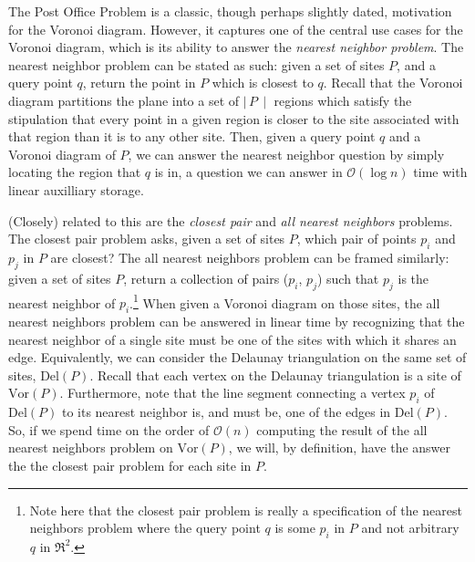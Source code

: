 \documentclass[12pt,twoside]{reedthesis}
\begin{document}
    The Post Office Problem is a classic, though perhaps slightly dated, motivation for the Voronoi diagram. However, it captures one of the central use cases for the Voronoi diagram, which is its ability to answer the \emph{nearest neighbor problem}. The nearest neighbor problem can be stated as such: given a set of sites $P$, and a query point $q$, return the point in $P$ which is closest to $q$. Recall that the Voronoi diagram partitions the plane into a set of $\mid\,P\,\mid$ regions which satisfy the stipulation that every point in a given region is closer to the site associated with that region than it is to any other site. Then, given a query point $q$ and a Voronoi diagram of $P$, we can answer the nearest neighbor question by simply locating the region that $q$ is in, a question we can answer in $\mathcal{O}(\log n)$ time with linear auxilliary storage.\citep[p. 214]{shamos}\par
    
    (Closely) related to this are the \emph{closest pair} and \emph{all nearest neighbors} problems. The closest pair problem asks, given a set of sites $P$, which pair of points $p_{i}$ and $p_{j}$ in $P$ are closest? The all nearest neighbors problem can be framed similarly: given a set of sites $P$, return a collection of pairs ($p_{i}$, $p_{j}$) such that $p_{j}$ is the nearest neighbor of $p_{i}$.\footnote{Note here that the closest pair problem is really a specification of the nearest neighbors problem where the query point $q$ is some $p_{i}$ in $P$ and not arbitrary $q$ in $\Re^2$.} When given a Voronoi diagram on those sites, the all nearest neighbors problem can be answered in linear time by recognizing that the nearest neighbor of a single site must be one of the sites with which it shares an edge. Equivalently, we can consider the Delaunay triangulation on the same set of sites, $\mbox{Del}(P)$. Recall that each vertex on the Delaunay triangulation is a site of $\mbox{Vor}(P)$. Furthermore, note that the line segment connecting a vertex $p_{i}$ of $\mbox{Del}(P)$ to its nearest neighbor is, and must be, one of the edges in $\mbox{Del}(P)$. So, if we spend time on the order of $\mathcal{O}(n)$ computing the result of the all nearest neighbors problem on $\mbox{Vor}(P)$, we will, by definition, have the answer the the closest pair problem for each site in $P$. 

\end{document}

